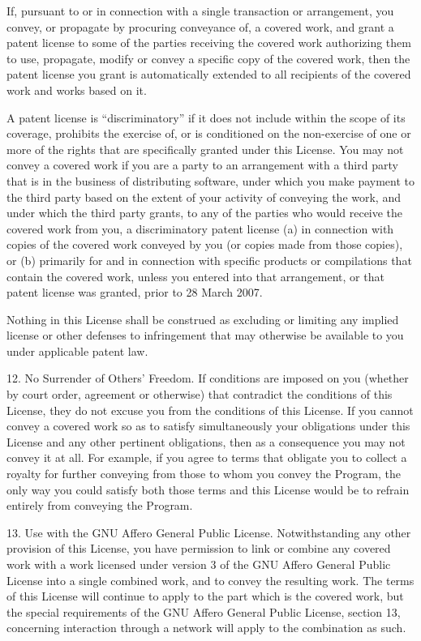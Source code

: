 If, pursuant to or in connection with a single transaction or arrangement, you convey, or propagate by procuring conveyance of, a covered work, and grant a patent license to some of the parties receiving the covered work authorizing them to use, propagate, modify or convey a specific copy of the covered work, then the patent license you grant is automatically extended to all recipients of the covered work and works based on it.

A patent license is “discriminatory” if it does not include within the scope of its coverage, prohibits the exercise of, or is conditioned on the non-exercise of one or more of the rights that are specifically granted under this License. You may not convey a covered work if you are a party to an arrangement with a third party that is in the business of distributing software, under which you make payment to the third party based on the extent of your activity of conveying the work, and under which the third party grants, to any of the parties who would receive the covered work from you, a discriminatory patent license (a) in connection with copies of the covered work conveyed by you (or copies made from those copies), or (b) primarily for and in connection with specific products or compilations that contain the covered work, unless you entered into that arrangement, or that patent license was granted, prior to 28 March 2007.

Nothing in this License shall be construed as excluding or limiting any implied license or other defenses to infringement that may otherwise be available to you under applicable patent law.

12. No Surrender of Others' Freedom.
If conditions are imposed on you (whether by court order, agreement or otherwise) that contradict the conditions of this License, they do not excuse you from the conditions of this License. If you cannot convey a covered work so as to satisfy simultaneously your obligations under this License and any other pertinent obligations, then as a consequence you may not convey it at all. For example, if you agree to terms that obligate you to collect a royalty for further conveying from those to whom you convey the Program, the only way you could satisfy both those terms and this License would be to refrain entirely from conveying the Program.

13. Use with the GNU Affero General Public License.
Notwithstanding any other provision of this License, you have permission to link or combine any covered work with a work licensed under version 3 of the GNU Affero General Public License into a single combined work, and to convey the resulting work. The terms of this License will continue to apply to the part which is the covered work, but the special requirements of the GNU Affero General Public License, section 13, concerning interaction through a network will apply to the combination as such.

